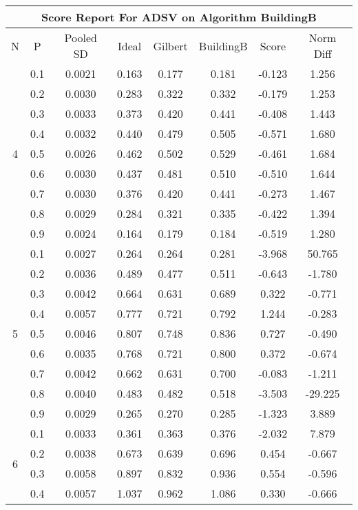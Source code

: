 \documentclass[11pt,a4paper]{report}
\begin{document}
\begin{longtable}{ | c | c || c | c | c | c | c | c | }
\hline
\multicolumn{8}{|c|}{ Score Report For ADSV on Algorithm BuildingB} \\
\hline
N & P & Pooled SD &  Ideal &  Gilbert & BuildingB  & Score & Norm Diff \\
 \hline
 \hline
 \endhead
\multirow{9}{*}{4} & 0.1 & 0.0021 & 0.163 & 0.177 & 0.181 & -0.123 & 1.256 \\
 & 0.2 & 0.0030 & 0.283 & 0.322 & 0.332 & -0.179 & 1.253 \\
 & 0.3 & 0.0033 & 0.373 & 0.420 & 0.441 & -0.408 & 1.443 \\
 & 0.4 & 0.0032 & 0.440 & 0.479 & 0.505 & -0.571 & 1.680 \\
 & 0.5 & 0.0026 & 0.462 & 0.502 & 0.529 & -0.461 & 1.684 \\
 & 0.6 & 0.0030 & 0.437 & 0.481 & 0.510 & -0.510 & 1.644 \\
 & 0.7 & 0.0030 & 0.376 & 0.420 & 0.441 & -0.273 & 1.467 \\
 & 0.8 & 0.0029 & 0.284 & 0.321 & 0.335 & -0.422 & 1.394 \\
 & 0.9 & 0.0024 & 0.164 & 0.179 & 0.184 & -0.519 & 1.280 \\
 \hline
\multirow{9}{*}{5} & 0.1 & 0.0027 & 0.264 & 0.264 & 0.281 & -3.968 & 50.765 \\
 & 0.2 & 0.0036 & 0.489 & 0.477 & 0.511 & -0.643 & -1.780 \\
 & 0.3 & 0.0042 & 0.664 & 0.631 & 0.689 & 0.322 & -0.771 \\
 & 0.4 & 0.0057 & 0.777 & 0.721 & 0.792 & 1.244 & -0.283 \\
 & 0.5 & 0.0046 & 0.807 & 0.748 & 0.836 & 0.727 & -0.490 \\
 & 0.6 & 0.0035 & 0.768 & 0.721 & 0.800 & 0.372 & -0.674 \\
 & 0.7 & 0.0042 & 0.662 & 0.631 & 0.700 & -0.083 & -1.211 \\
 & 0.8 & 0.0040 & 0.483 & 0.482 & 0.518 & -3.503 & -29.225 \\
 & 0.9 & 0.0029 & 0.265 & 0.270 & 0.285 & -1.323 & 3.889 \\
 \hline
\multirow{9}{*}{6} & 0.1 & 0.0033 & 0.361 & 0.363 & 0.376 & -2.032 & 7.879 \\
 & 0.2 & 0.0038 & 0.673 & 0.639 & 0.696 & 0.454 & -0.667 \\
 & 0.3 & 0.0058 & 0.897 & 0.832 & 0.936 & 0.554 & -0.596 \\
 & 0.4 & 0.0057 & 1.037 & 0.962 & 1.086 & 0.330 & -0.666 \\

\end{longtable}
\end{document}
